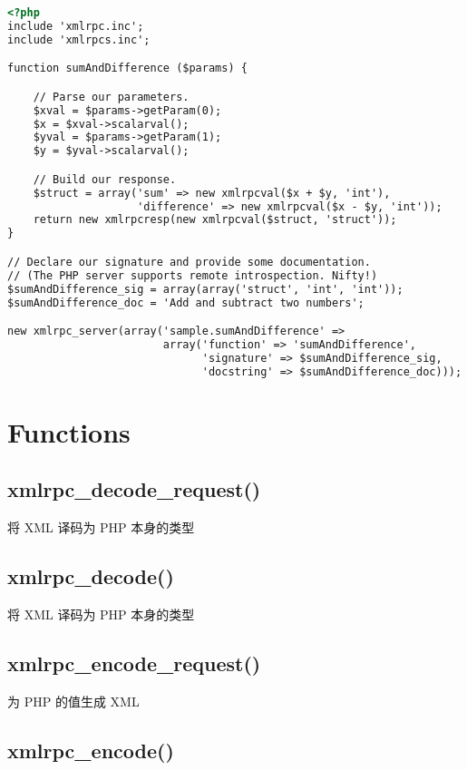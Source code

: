 \begin{lstlisting}[language=HTML]
<?php
include 'xmlrpc.inc';
include 'xmlrpcs.inc';

function sumAndDifference ($params) {

    // Parse our parameters.
    $xval = $params->getParam(0);
    $x = $xval->scalarval();
    $yval = $params->getParam(1);
    $y = $yval->scalarval();

    // Build our response.
    $struct = array('sum' => new xmlrpcval($x + $y, 'int'),
                    'difference' => new xmlrpcval($x - $y, 'int'));
    return new xmlrpcresp(new xmlrpcval($struct, 'struct'));
}

// Declare our signature and provide some documentation.
// (The PHP server supports remote introspection. Nifty!)
$sumAndDifference_sig = array(array('struct', 'int', 'int'));
$sumAndDifference_doc = 'Add and subtract two numbers';

new xmlrpc_server(array('sample.sumAndDifference' =>
                        array('function' => 'sumAndDifference',
                              'signature' => $sumAndDifference_sig,
                              'docstring' => $sumAndDifference_doc)));
\end{lstlisting}

\section{Functions}


\subsection{xmlrpc\_decode\_request()}

将 XML 译码为 PHP 本身的类型

\subsection{xmlrpc\_decode()}

将 XML 译码为 PHP 本身的类型

\subsection{xmlrpc\_encode\_request()}

为 PHP 的值生成 XML

\subsection{xmlrpc\_encode()}

